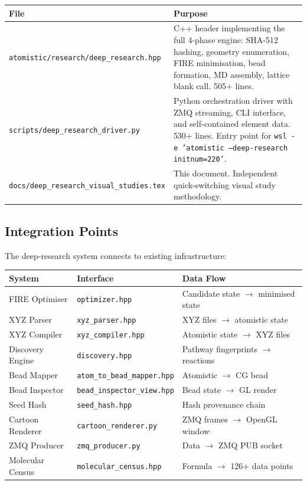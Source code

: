 \documentclass[11pt,a4paper]{article}
\begin{document}
\begin{center}
\begin{tabular}{lp{8cm}}
\toprule
\textbf{File} & \textbf{Purpose} \\
\midrule
\texttt{atomistic/research/deep\_research.hpp} &
  C++ header implementing the full 4-phase engine: SHA-512 hashing,
  geometry enumeration, FIRE minimisation, bead formation, MD assembly,
  lattice blank call.  505+ lines. \\
\texttt{scripts/deep\_research\_driver.py} &
  Python orchestration driver with ZMQ streaming, CLI interface, and
  self-contained element data.  530+ lines.  Entry point for
  \texttt{wsl~-e~'atomistic --deep-research initnum=220'}. \\
\texttt{docs/deep\_research\_visual\_studies.tex} &
  This document.  Independent quick-switching visual study methodology. \\
\bottomrule
\end{tabular}
\end{center}

\subsection{Integration Points}

The deep-research system connects to existing infrastructure:

\begin{center}
\begin{tabular}{llp{6cm}}
\toprule
\textbf{System} & \textbf{Interface} & \textbf{Data Flow} \\
\midrule
FIRE Optimiser    & \texttt{optimizer.hpp} & Candidate state $\to$ minimised state \\
XYZ Parser        & \texttt{xyz\_parser.hpp} & XYZ files $\to$ atomistic state \\
XYZ Compiler      & \texttt{xyz\_compiler.hpp} & Atomistic state $\to$ XYZ files \\
Discovery Engine  & \texttt{discovery.hpp} & Pathway fingerprints $\to$ reactions \\
Bead Mapper       & \texttt{atom\_to\_bead\_mapper.hpp} & Atomistic $\to$ CG bead \\
Bead Inspector    & \texttt{bead\_inspector\_view.hpp} & Bead state $\to$ GL render \\
Seed Hash         & \texttt{seed\_hash.hpp} & Hash provenance chain \\
Cartoon Renderer  & \texttt{cartoon\_renderer.py} & ZMQ frames $\to$ OpenGL window \\
ZMQ Producer      & \texttt{zmq\_producer.py} & Data $\to$ ZMQ PUB socket \\
Molecular Census  & \texttt{molecular\_census.hpp} & Formula $\to$ 126+ data points \\
\bottomrule
\end{tabular}
\end{center}
\end{document}
